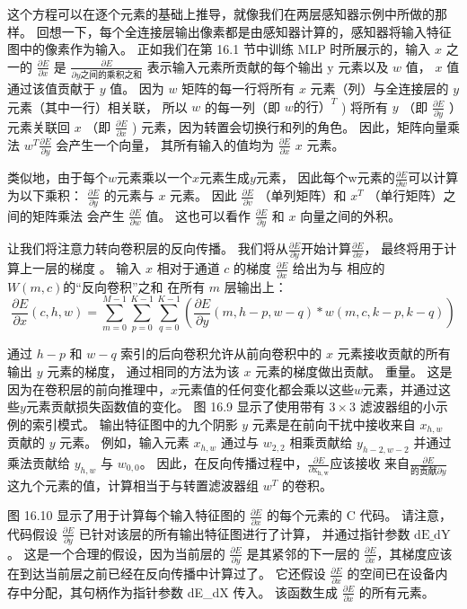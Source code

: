 这个方程可以在逐个元素的基础上推导，就像我们在两层感知器示例中所做的那样。 
回想一下，每个全连接层输出像素都是由感知器计算的，感知器将输入特征图中的像素作为输入。 
正如我们在第 16.1 节中训练 MLP 时所展示的，输入 $x$ 之一的 $\frac{\partial E}{\partial x}$ 是 $\frac{\partial E}{\partial y 之间的乘积之和 }$ 表示输入元素所贡献的每个输出 $\mathrm{y}$ 元素以及 $w$ 值，
$x$ 值通过该值贡献于 $y$ 值。 因为 $w$ 矩阵的每一行将所有 $x$ 元素（列）与全连接层的 $y$ 元素（其中一行）相关联，
所以 $w$ 的每一列（即 $w 的行） ^{T}$ ) 将所有 $y$ （即 $\frac{\partial E}{\partial y}$ ）元素关联回 $x$ （即 $\frac{\partial E}{\partial x}$ ) 元素，因为转置会切换行和列的角色。 
因此，矩阵向量乘法 $w^{T} \frac{\partial E}{\partial y}$ 会产生一个向量，
其所有输入的值均为 $\frac{\partial E}{\partial x}$ $x$ 元素。

类似地，由于每个$w$元素乘以一个$x$元素生成$y$元素，
因此每个w元素的$\frac{\partial E}{\partial w}$可以计算为以下乘积： 
$\frac{\partial E}{\partial y}$ 的元素与 $x$ 元素。 
因此 $\frac{\partial E}{\partial v}$ （单列矩阵）和 $x^{T}$ （单行矩阵）之间的矩阵乘法
会产生 $\frac{\partial E}{\partial w}$ 值。 
这也可以看作 $\frac{\partial E}{\partial y}$ 和 $x$ 向量之间的外积。

让我们将注意力转向卷积层的反向传播。 
我们将从$\frac{\partial E}{\partial y}$开始计算$\frac{\partial E}{\partial x}$，
最终将用于计算上一层的梯度 。 
输入 $x$ 相对于通道 $c$ 的梯度 $\frac{\partial E}{\partial x}$ 给出为与
相应的 $W(m, c) 的“反向卷积”之和 $ 在所有 $m$ 层输出上：
$$
\frac{\partial E}{\partial x}(c, h, w)=\sum_{m=0}^{M-1} \sum_{p=0}^{K-1} \sum_{q =0}^{K-1}\left(\frac{\partial E}{\partial y}(m, h-p, w-q) * w(m, c, k-p, k-q)\right)
$$

通过 $h-p$ 和 $w-q$ 索引的后向卷积允许从前向卷积中的 $x$ 元素接收贡献的所有输出 $y$ 元素的梯度，
通过相同的方法为该 $x$ 元素的梯度做出贡献。 重量。 
这是因为在卷积层的前向推理中，$x$元素值的任何变化都会乘以这些$w$元素，并通过这些$y$元素贡献损失函数值的变化。 
图 16.9 显示了使用带有 $3 \times 3$ 滤波器组的小示例的索引模式。 
输出特征图中的九个阴影 $y$ 元素是在前向干扰中接收来自 $x_{h, w}$ 贡献的 $y$ 元素。 
例如，输入元素 $x_{h, w}$ 通过与 $w_{2,2}$ 相乘贡献给 $y_{h-2, w-2}$ 并通过乘法贡献给 $y_{h, w}$ 与 $w_{0,0}$。 
因此，在反向传播过程中，$\frac{\partial E}{\partial \mathrm{x}_{\mathrm{h}, \mathrm{w}}}$应该接收
来自$\frac{\partial E}{的贡献 \partial y}$ 这九个元素的值，计算相当于与转置滤波器组 $w^{T}$ 的卷积。

图 16.10 显示了用于计算每个输入特征图的 $\frac{\partial E}{\partial x}$ 的每个元素的 $\mathrm{C}$ 代码。 
请注意，代码假设 $\frac{\partial E}{\partial y}$ 已针对该层的所有输出特征图进行了计算，
并通过指针参数 $\mathrm{dE} \_\mathrm{ dY}$。 
这是一个合理的假设，因为当前层的 $\frac{\partial E}{\partial y}$ 
是其紧邻的下一层的 $\frac{\partial E}{\partial x}$，其梯度应该 在到达当前层之前已经在反向传播中计算过了。 
它还假设 $\frac{\partial E}{\partial x}$ 的空间已在设备内存中分配，其句柄作为指针参数 dE\_dX 传入。 
该函数生成 $\frac{\partial E}{\partial x}$ 的所有元素。

